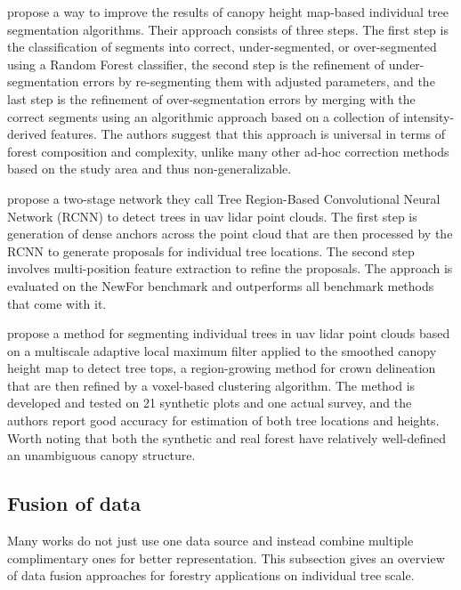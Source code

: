 \citet{lisiewiczCorrectingResultsCHMBased2022} propose a way to improve the results of canopy height map-based individual tree segmentation algorithms.
Their approach consists of three steps.
The first step is the classification of segments into correct, under-segmented, or over-segmented using a Random Forest classifier, the second step is the refinement of under-segmentation errors by re-segmenting them with adjusted parameters, and the last step is the refinement of over-segmentation errors by merging with the correct segments using an algorithmic approach based on a collection of intensity-derived features.
The authors suggest that this approach is universal in terms of forest composition and complexity, unlike many other ad-hoc correction methods based on the study area and thus non-generalizable.

\citet{wangAutomaticDetectionIndividual2023} propose a two-stage network they call Tree Region-Based Convolutional Neural Network (RCNN) to detect trees in \gls{uav} \gls{lidar} point clouds.
The first step is generation of dense anchors across the point cloud that are then processed by the RCNN to generate proposals for individual tree locations.
The second step involves multi-position feature extraction to refine the proposals.
The approach is evaluated on the NewFor benchmark \citep{eysnAlpineITDBenchmark2015} and outperforms all benchmark methods that come with it.

\citet{fuIndividualTreeSegmentationUAV2024} propose a method for segmenting individual trees in \gls{uav} \gls{lidar} point clouds based on a multiscale adaptive local maximum filter applied to the smoothed canopy height map to detect tree tops, a region-growing method for crown delineation that are then refined by a voxel-based clustering algorithm.
The method is developed and tested on 21 synthetic plots and one actual survey, and the authors report good accuracy for estimation of both tree locations and heights.
Worth noting that both the synthetic and real forest have relatively well-defined an unambiguous canopy structure.

\subsection{Fusion of data}

Many works do not just use one data source and instead combine multiple complimentary ones for better representation.
This subsection gives an overview of data fusion approaches for forestry applications on individual tree scale.

